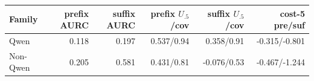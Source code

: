 \begin{tabular}{lrrrrr}
\toprule
Family & prefix AURC & suffix AURC & prefix $U_{.5}$/cov & suffix $U_{.5}$/cov & cost-5 pre/suf \\
\midrule
Qwen & 0.118 & 0.197 & 0.537/0.94 & 0.358/0.91 & -0.315/-0.801 \\
Non-Qwen & 0.205 & 0.581 & 0.431/0.81 & -0.076/0.53 & -0.467/-1.244 \\
\bottomrule
\end{tabular}
